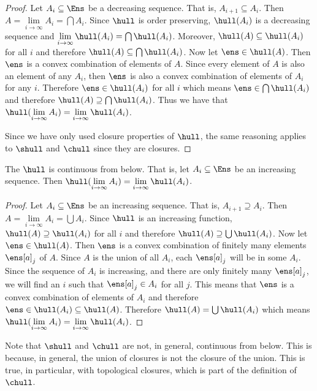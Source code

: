 \begin{mathSection}
\begin{proof}
	Let $A_i \subseteq \Ens$ be a decreasing sequence. That is, $A_{i+1} \subseteq A_i$. Then $A = \lim\limits_{i \to \infty} A_i = \bigcap A_i$. Since $\hull$ is order preserving, $\hull(A_i)$ is a decreasing sequence and $\lim\limits_{i \to \infty} \hull(A_i) = \bigcap \hull(A_i)$. Moreover, $\hull(A) \subseteq \hull(A_i)$ for all $i$ and therefore $\hull(A) \subseteq \bigcap \hull(A_i)$. Now let $\ens \in \hull(A)$. Then $\ens$ is a convex combination of elements of $A$. Since every element of $A$ is also an element of any $A_i$, then $\ens$ is also a convex combination of elements of $A_i$ for any $i$. Therefore $\ens \in \hull(A_i)$ for all $i$ which means $\ens \in \bigcap \hull(A_i)$ and therefore $\hull(A) \supseteq \bigcap \hull(A_i)$. Thus we have that $\hull(\lim\limits_{i \to \infty} A_i) = \lim\limits_{i \to \infty} \hull(A_i)$.
	
	Since we have only used closure properties of $\hull$, the same reasoning applies to $\shull$ and $\chull$ since they are closures.
\end{proof}

\begin{prop}
	The $\hull$ is continuous from below. That is, let $A_i \subseteq \Ens$ be an increasing sequence. Then $\hull(\lim\limits_{i \to \infty} A_i) = \lim\limits_{i \to \infty} \hull(A_i)$.
\end{prop}

\begin{proof}
	Let $A_i \subseteq \Ens$ be an increasing sequence. That is, $A_{i+1} \supseteq A_i$. Then $A = \lim\limits_{i \to \infty} A_i = \bigcup A_i$. Since $\hull$ is an increasing function, $\hull(A) \supseteq \hull(A_i)$ for all $i$ and therefore $\hull(A) \supseteq \bigcup \hull(A_i)$. Now let $\ens \in \hull(A)$. Then $\ens$ is a convex combination of finitely many elements $\ens[a]_j$ of $A$. Since $A$ is the union of all $A_i$, each $\ens[a]_j$ will be in some $A_i$. Since the sequence of $A_i$ is increasing, and there are only finitely many $\ens[a]_j$, we will find an $i$ such that $\ens[a]_j \in A_i$ for all $j$. This means that $\ens$ is a convex combination of elements of $A_i$ and therefore $\ens \in \hull(A_i) \subseteq \hull(A)$. Therefore $\hull(A) = \bigcup \hull(A_i)$ which means $\hull(\lim\limits_{i \to \infty} A_i) = \lim\limits_{i \to \infty} \hull(A_i)$.
\end{proof}


\begin{remark}
	Note that $\shull$ and $\chull$ are not, in general, continuous from below. This is because, in general, the union of closures is not the closure of the union. This is true, in particular, with topological closures, which is part of the definition of $\chull$.
	

\end{remark}
\end{mathSection}
